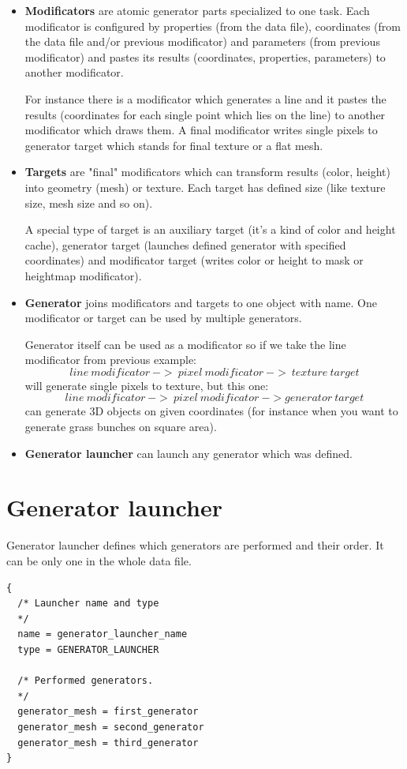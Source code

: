 \documentclass[9pt]{article}
\begin{document}
\begin{itemize}
\item{\bf Modificators} are atomic generator parts specialized to one task. 
Each modificator is configured by properties (from the data file), 
coordinates (from the data file and/or previous modificator) and 
parameters (from previous modificator) and pastes its results 
(coordinates, properties, parameters) to another modificator.

For instance there is a modificator which generates a line and it 
pastes the results (coordinates for each single point which lies on the line) 
to another modificator which draws them. A final modificator writes single
pixels to generator target which stands for final texture or a flat mesh.

\item{\bf Targets} are "final" modificators which can transform
results (color, height) into geometry (mesh) or texture. Each 
target has defined size (like texture size, mesh size and so on).

A special type of target is an auxiliary target 
(it's a kind of color and height cache), generator target 
(launches defined generator with specified coordinates) and modificator target
(writes color or height to mask or heightmap modificator).

\item{\bf Generator} joins modificators and targets to one object with name. 
One modificator or target can be used by multiple generators.

Generator itself can be used as a modificator so
if we take the line modificator from previous example:
\[
line~modificator~->~pixel~modificator~->~texture~target
\]
will generate single pixels to texture, but this one:
\[
line~modificator~->~pixel~modificator~->generator~target
\]
can generate 3D objects on given coordinates (for instance when you want to
generate grass bunches on square area).

\item{\bf Generator launcher} can launch any generator which was defined.

\end{itemize}

\newpage
\section{Generator launcher}
Generator launcher defines which generators are performed and their order. 
It can be only one in the whole data file.
\begin{verbatim}
{
  /* Launcher name and type
  */
  name = generator_launcher_name
  type = GENERATOR_LAUNCHER

  /* Performed generators. 
  */
  generator_mesh = first_generator
  generator_mesh = second_generator
  generator_mesh = third_generator
}
\end{verbatim}
\end{document}
